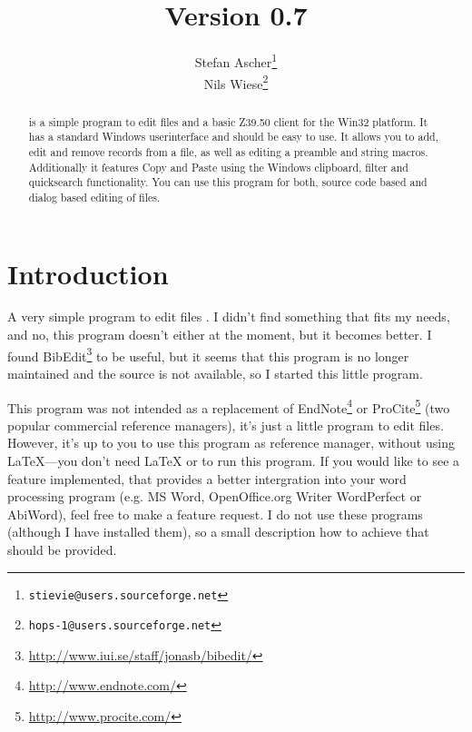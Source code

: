 \documentclass[oneside,10pt]{article}
\makeatletter
\newcommand{\at}{@}
\newcommand{\dt}{.}
\newcommand{\stievieaddress}{stievie\at{}users\dt{}sourceforge\dt{}net}
\newcommand{\stieviemail}{\texttt{\stievieaddress}}
\newcommand{\nilsaddress}{hops-1\at{}users\dt{}sourceforge\dt{}net}
\newcommand{\nilsemail}{\texttt{\nilsaddress}}
\newcommand\VER{0.7}
\makeatother
\begin{document}
\title{\BibEdt \\ Version \VER{}}
\author{Stefan Ascher\footnote{\protect\stieviemail{}}\\
  Nils Wiese\footnote{\protect\nilsemail{}}}
\maketitle

\begin{abstract}
\BibEdt{} is a simple program to edit \BibTeX{} \cite{patashnik:1988a} files and
a basic Z39.50 client for
the Win32 platform. It has a standard Windows userinterface and should be easy to
use. It allows you to add, edit and remove records from a \BibTeX{} file, as well
as editing a preamble and string macros. Additionally it features Copy and Paste
using the Windows clipboard, filter and quicksearch functionality. You can use
this program for both, source code based and dialog based editing of \BibTeX{}
files.
\end{abstract}

\tableofcontents

\VerbatimFootnotes


\section{Introduction}
\label{sec:Introduction}

A very simple program to edit \BibTeX{} files \cite{jacobson:1996}. I didn't find
something that fits my needs, and no, this program doesn't either at the moment,
but it becomes better. I found BibEdit\footnote{\url{http://www.iui.se/staff/jonasb/bibedit/}}
to be useful, but it seems that this program is no longer maintained and the source
is not available, so I started this little program.

This program was not intended as a replacement of EndNote\footnote{\url{http://www.endnote.com/}}
or ProCite\footnote{\url{http://www.procite.com/}} (two popular commercial reference
managers), it's just a little program
to edit \BibTeX{} files. However, it's up to you to use this program as reference
manager, without using \LaTeX{}---you don't need \LaTeX{} or \BibTeX{} to run this
program. If you would like to see a feature implemented, that provides a better
intergration into your word processing program (e.g. MS Word, OpenOffice.org Writer
WordPerfect or AbiWord), feel free to make a feature request. I do not use these programs
(although I have installed them), so a small description how to achieve that should
be provided.
\end{document}
